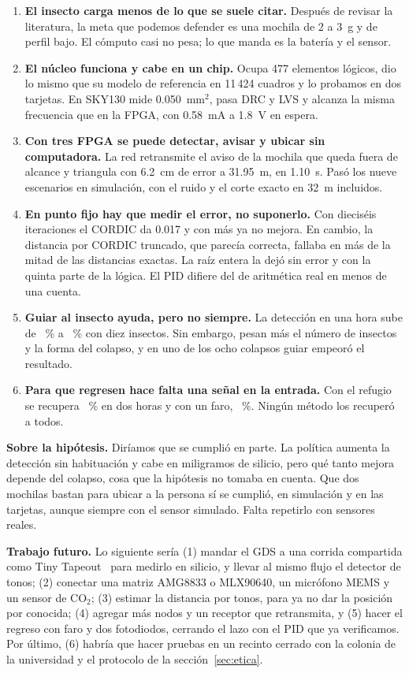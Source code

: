 \begin{enumerate}
    \item \textbf{El insecto carga menos de lo que se suele citar.} Después de revisar la literatura, la meta que podemos
        defender es una mochila de 2 a 3~g y de perfil bajo. El cómputo casi no pesa; lo que manda es la batería y el sensor.
  \item \textbf{El núcleo funciona y cabe en un chip.} Ocupa 477 elementos lógicos, dio lo mismo que su modelo de referencia
        en 11\,424 cuadros y lo probamos en dos tarjetas. En SKY130 mide 0.050~mm$^2$, pasa DRC y LVS y alcanza la misma
        frecuencia que en la FPGA, con 0.58~mA a 1.8~V en espera.
  \item \textbf{Con tres FPGA se puede detectar, avisar y ubicar sin computadora.} La red retransmite el aviso de la mochila
        que queda fuera de alcance y triangula con 6.2~cm de error a 31.95~m, en 1.10~s. Pasó los nueve escenarios en
        simulación, con el ruido y el corte exacto en 32~m incluidos.
  \item \textbf{En punto fijo hay que medir el error, no suponerlo.} Con dieciséis iteraciones el CORDIC da 0.017\textdegree{} y con más ya no
        mejora. En cambio, la distancia por CORDIC truncado, que parecía correcta, fallaba en más de la mitad de las distancias exactas. La
        raíz entera la dejó sin error y con la quinta parte de la lógica. El PID difiere del de aritmética real en menos de una cuenta.
  \item \textbf{Guiar al insecto ayuda, pero no siempre.} La detección en una hora sube de \pPasivaSesenta~\% a
        \pGuiadaSesenta~\% con diez insectos. Sin embargo, pesan más el número de insectos y la forma del colapso, y en uno de
        los ocho colapsos guiar empeoró el resultado.
  \item \textbf{Para que regresen hace falta una señal en la entrada.} Con el refugio se recupera \regTrampaDos~\% en dos
        horas y con un faro, \regFaroDos~\%. Ningún método los recuperó a todos.
\end{enumerate}

\textbf{Sobre la hipótesis.} Diríamos que se cumplió en parte. La política aumenta la detección sin habituación y cabe en miligramos de
silicio, pero qué tanto mejora depende del colapso, cosa que la hipótesis no tomaba en cuenta. Que dos mochilas bastan para ubicar a
la persona sí se cumplió, en simulación y en las tarjetas, aunque siempre con el sensor simulado. Falta repetirlo con sensores reales.

\textbf{Trabajo futuro.} Lo siguiente sería (1) mandar el GDS a una corrida compartida como Tiny Tapeout~\cite{tinytapeout}
para medirlo en silicio, y llevar al mismo flujo el detector de tonos; (2) conectar una matriz AMG8833 o MLX90640, un
micrófono MEMS y un sensor de CO$_2$; (3) estimar la distancia por tonos, para ya no dar la posición por conocida; (4) agregar
más nodos y un receptor que retransmita, y (5) hacer el regreso con faro y dos fotodiodos, cerrando el lazo con el PID que ya
verificamos. Por último, (6) habría que hacer pruebas en un recinto cerrado con la colonia de la universidad y el protocolo
de la sección~\ref{sec:etica}.
